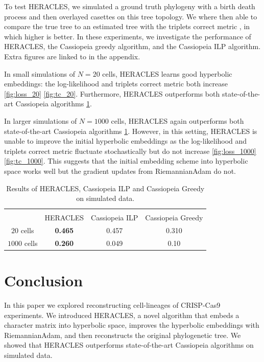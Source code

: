 \documentclass{article}
\begin{document}
To test HERACLES, we simulated a ground truth phylogeny with a birth death process and then overlayed casettes on this tree topology. We where then able to compare the true tree to an estimated tree with the triplets correct metric \cite{sand2013practical}, in which higher is better. In these experiments, we investigate the performance of HERACLES, the Cassiopeia greedy algorithm, and the Cassiopeia ILP algorithm. Extra figures are linked to in the appendix.

In small simulations of $N=20$ cells, HERACLES learns good hyperbolic embeddings: the log-likelihood and triplets correct metric both increase \ref{fig:loss_20} \ref{fig:tc_20}. Furthermore, HERACLES outperforms both state-of-the-art Cassiopeia algorithms \ref{tab:results}.

In larger simulations of $N=1000$ cells, HERACLES again outperforms both state-of-the-art Cassiopeia algorithms \ref{tab:results}. However, in this setting, HERACLES is unable to improve the initial hyperbolic embeddings as the log-likelihood and triplets correct metric fluctuate stochastically but do not increase \ref{fig:loss_1000} \ref{fig:tc_1000}. This suggests that the initial embedding scheme into hyperbolic space works well but the gradient updates from RiemannianAdam do not.


\begin{table}[t]
  \label{tab:results}
  \begin{center}
    \begin{tabular}{||c c c c||} 
      \hline
        \\  & HERACLES &  Cassiopeia ILP & Cassiopeia Greedy  \\ 
      \hline\hline
      $20$ cells & \textbf{0.465}  & 0.457 & 0.310 \\ 
      \hline
      $1000$ cells & \textbf{0.260} & 0.049 & 0.10 \\
      \hline
    \end{tabular}
  \end{center}
  \caption{Results of HERACLES, Cassiopeia ILP and Cassiopeia Greedy on simulated data.}
\end{table}


\section{Conclusion}


In this paper we explored reconstructing cell-lineages of CRISP-Cas9 experiments. We introduced HERACLES, a novel algorithm that embeds a character matrix into hyperbolic space, improves the hyperbolic embeddings with RiemannianAdam, and then reconstructs the original phylogenetic tree. We showed that HERACLES outperforms state-of-the-art Cassiopeia algorithms on simulated data.
\end{document}
